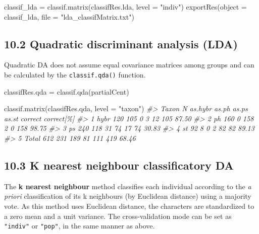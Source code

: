 \documentclass[
  11pt,
  a4paper]{article}
\newenvironment{Shaded}{\begin{snugshade}}{\end{snugshade}}
\newcommand{\AttributeTok}[1]{\textcolor[rgb]{0.77,0.63,0.00}{#1}}
\newcommand{\CommentTok}[1]{\textcolor[rgb]{0.56,0.35,0.01}{\textit{#1}}}
\newcommand{\FunctionTok}[1]{\textcolor[rgb]{0.00,0.00,0.00}{#1}}
\newcommand{\NormalTok}[1]{#1}
\newcommand{\OtherTok}[1]{\textcolor[rgb]{0.56,0.35,0.01}{#1}}
\newcommand{\StringTok}[1]{\textcolor[rgb]{0.31,0.60,0.02}{#1}}
\begin{document}
\begin{Shaded}
\begin{Highlighting}[]
\NormalTok{classif\_lda }\OtherTok{=} \FunctionTok{classif.matrix}\NormalTok{(classifRes.lda, }\AttributeTok{level =} \StringTok{"indiv"}\NormalTok{)}
\FunctionTok{exportRes}\NormalTok{(}\AttributeTok{object =}\NormalTok{ classif\_lda, }\AttributeTok{file =} \StringTok{"lda\_classifMatrix.txt"}\NormalTok{)}
\end{Highlighting}
\end{Shaded}

\hypertarget{quadratic-discriminant-analysis-lda}{%
\subsection{10.2 Quadratic discriminant analysis
(LDA)}\label{quadratic-discriminant-analysis-lda}}

Quadratic DA does not assume equal covariance matrices among groups and
can be calculated by the \texttt{classif.qda()} function.

\begin{Shaded}
\begin{Highlighting}[]
\NormalTok{classifRes.qda }\OtherTok{=} \FunctionTok{classif.qda}\NormalTok{(partialCent)}


\FunctionTok{classif.matrix}\NormalTok{(classifRes.qda, }\AttributeTok{level =} \StringTok{"taxon"}\NormalTok{)}
\CommentTok{\#\textgreater{}   Taxon   N as.hybr as.ph as.ps as.st correct correct[\%]}
\CommentTok{\#\textgreater{} 1  hybr 120     105     0     3    12     105      87.50}
\CommentTok{\#\textgreater{} 2    ph 160       0   158     2     0     158      98.75}
\CommentTok{\#\textgreater{} 3    ps 240     118    31    74    17      74      30.83}
\CommentTok{\#\textgreater{} 4    st  92       8     0     2    82      82      89.13}
\CommentTok{\#\textgreater{} 5 Total 612     231   189    81   111     419      68.46}
\end{Highlighting}
\end{Shaded}

\hypertarget{k-nearest-neighbour-classificatory-da}{%
\subsection{10.3 K nearest neighbour classificatory
DA}\label{k-nearest-neighbour-classificatory-da}}

The \textbf{k nearest neighbour} method classifies each individual
according to the \emph{a priori} classification of its k neighbours (by
Euclidean distance) using a majority vote. As this method uses Euclidean
distance, the characters are standardized to a zero mean and a unit
variance. The cross-validation mode can be set as \texttt{"indiv"} or
\texttt{"pop"}, in the same manner as above.
\end{document}

